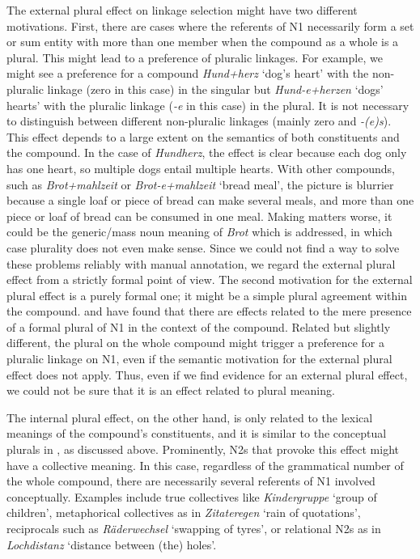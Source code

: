 The external plural effect on linkage selection might have two different motivations.
First, there are cases where the referents of N1 necessarily form a set or sum entity with more than one member when the compound as a whole is a plural.
This might lead to a preference of pluralic linkages.
For example, we might see a preference for a compound \textit{Hund+herz} `dog's heart' with the non-pluralic linkage (zero in this case) in the singular but \textit{Hund-e+herzen} `dogs' hearts' with the pluralic linkage (\textit{-e} in this case) in the plural.
It is not necessary to distinguish between different non-pluralic linkages (mainly zero and \textit{-(e)s}).
This effect depends to a large extent on the semantics of both constituents and the compound.
In the case of \textit{Hundherz}, the effect is clear because each dog only has one heart, so multiple dogs entail multiple hearts.
With other compounds, such as \textit{Brot+mahlzeit} or \textit{Brot-e+mahlzeit} `bread meal', the picture is blurrier because a single loaf or piece of bread can make several meals, and more than one piece or loaf of bread can be consumed in one meal.
Making matters worse, it could be the generic\slash mass noun meaning of \textit{Brot} which is addressed, in which case plurality does not even make sense.
Since we could not find a way to solve these problems reliably with manual annotation, we regard the external plural effect from a strictly formal point of view.
The second motivation for the external plural effect is a purely formal one; it might be a simple plural agreement within the compound.
\textcite{BangaEa2013a} and \textcite{BangaEa2013b} have found that there are effects related to the mere presence of a formal plural of N1 in the context of the compound.
Related but slightly different, the plural on the whole compound might trigger a preference for a pluralic linkage on N1, even if the semantic motivation for the external plural effect does not apply.
Thus, even if we find evidence for an external plural effect, we could not be sure that it is an effect related to plural meaning.

The internal plural effect, on the other hand, is only related to the lexical meanings of the compound's constituents, and it is similar to the conceptual plurals in \textcite{BangaEa2013b}, as discussed above.
Prominently, N2s that provoke this effect might have a collective meaning.
In this case, regardless of the grammatical number of the whole compound, there are necessarily several referents of N1 involved conceptually.
Examples include true collectives like \textit{Kindergruppe} `group of children', metaphorical collectives as in \textit{Zitateregen} `rain of quotations', reciprocals such as \textit{Räderwechsel} `swapping of tyres', or relational N2s as in \textit{Lochdistanz} `distance between (the) holes'.


